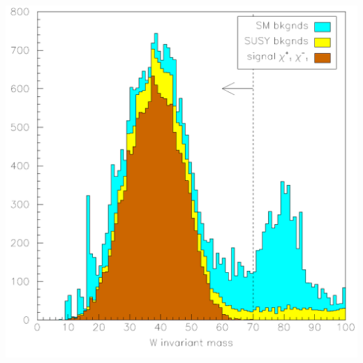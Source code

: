 \documentclass[landscape]{article}
\begin{document}
\mbox{ }

\vfill

\begin{center}
  \includegraphics[width=0.7\linewidth]{allnew_8.pdf}
\end{center}

\vfill

\mbox{ }
\end{document}

